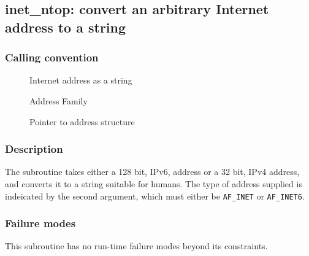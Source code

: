 \clearpage
{}
{}
\label{subr:inet-ntop}
\subsection*{inet\_ntop: convert an arbitrary Internet address to a string}

\subsubsection*{Calling convention}

\begin{description}
\item[] Internet address as a string
\item[] Address Family
\item[] Pointer to address structure
\end{description}

\subsubsection*{Description}

The  subroutine takes either a 128 bit, IPv6,
address or a 32 bit, IPv4 address, and converts it to a string
suitable for humans.  The type of address supplied is indeicated by
the second argument, which must either be \verb|AF_INET| or
\verb|AF_INET6|.

\subsubsection*{Failure modes}

This subroutine has no run-time failure modes beyond its constraints.
